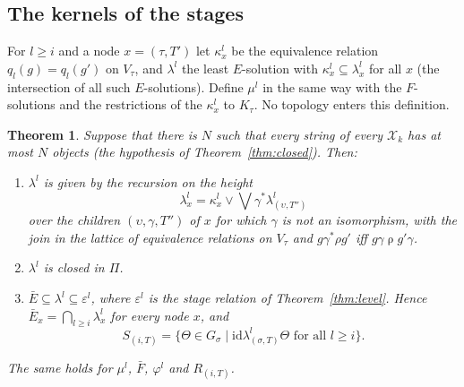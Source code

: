 \documentclass[11pt]{amsart}
\newtheorem{thm}{Theorem}[section]
\theoremstyle{definition}
\newcommand{\cX}{\mathcal X}
\newcommand{\id}{\mathrm{id}}
\begin{document}
\subsection*{The kernels of the stages}
For $l\ge i$ and a node $x=(\tau,T')$ let $\kappa^l_x$ be the
equivalence relation $q_l(g)=q_l(g')$ on $V_\tau$, and $\lambda^l$
the least $E$-solution with $\kappa^l_x\subseteq\lambda^l_x$ for all
$x$ (the intersection of all such $E$-solutions). Define $\mu^l$ in
the same way with the $F$-solutions and the restrictions of the
$\kappa^l_x$ to $K_\tau$. No topology enters this definition.

\begin{thm}\label{thm:kernel}
Suppose that there is $N$ such that every string of every $\cX_k$ has
at most $N$ objects (the hypothesis of Theorem~\ref{thm:closed}). Then:
\begin{enumerate}
\item[(a)] $\lambda^l$ is given by the recursion on the height
\begin{equation}\label{eq:rec}
\lambda^l_x=\kappa^l_x\vee\bigvee\gamma^*\lambda^l_{(\upsilon,T'')}
\end{equation}
over the children $(\upsilon,\gamma,T'')$ of $x$ for which $\gamma$
is not an isomorphism, with the join in the lattice of equivalence
relations on $V_\tau$ and $g\mathrel{\gamma^*\rho}g'$ iff
$g\gamma\mathrel\rho g'\gamma$.
\item[(b)] $\lambda^l$ is closed in $\Pi$.
\item[(c)] $\bar E\subseteq\lambda^l\subseteq\varepsilon^l$, where
$\varepsilon^l$ is the stage relation of Theorem~\ref{thm:level}. Hence
$\bar E_x=\bigcap_{l\ge i}\lambda^l_x$ for every node $x$, and
\[
S_{(i,T)}=\{\Theta\in G_\sigma\mid\id\mathrel{\lambda^l_{
(\sigma,T)}}\Theta\text{ for all }l\ge i\}.
\]
\end{enumerate}
The same holds for $\mu^l$, $\bar F$, $\varphi^l$ and $R_{(i,T)}$.
\end{thm}
\end{document}
